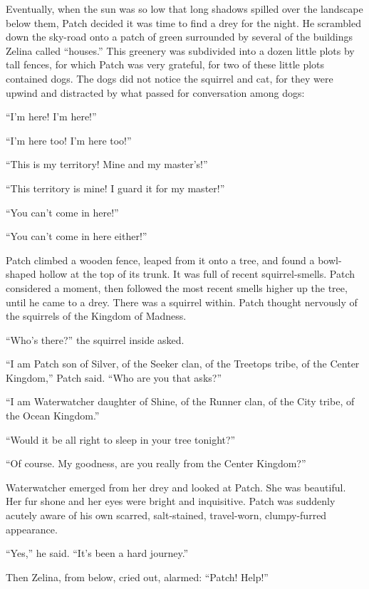 \documentclass[ebook,oneside,openany,17pt]{memoir}
\newenvironment{tolerant}[1]{%
  \par\tolerance=#1\relax
}{%
  \par
}
\begin{document}
\begin{tolerant}{1500}
Eventually, when the sun was so low that long shadows spilled over the
landscape below them, Patch decided it was time to find a drey for the
night. He scrambled down the sky-road onto a patch of green surrounded
by several of the buildings Zelina called “houses.” This greenery was
subdivided into a dozen little plots by tall fences, for which Patch
was very grateful, for two of these little plots contained dogs. The
dogs did not notice the squirrel and cat, for they were upwind and
distracted by what passed for conversation among dogs:
\end{tolerant}

“I’m here! I’m here!”

“I’m here too! I’m here too!”

“This is my territory! Mine and my master’s!”

“This territory is mine! I guard it for my master!”

“You can’t come in here!”

“You can’t come in here either!”

Patch climbed a wooden fence, leaped from it onto a tree, and found a
bowl-shaped hollow at the top of its trunk. It was full of recent
squirrel-smells. Patch considered a moment, then followed the most
recent smells higher up the tree, until he came to a drey. There was a
squirrel within. Patch thought nervously of the squirrels of the
Kingdom of Madness.

“Who’s there?” the squirrel inside asked.

“I am Patch son of Silver, of the Seeker clan, of the Treetops tribe,
of the Center Kingdom,” Patch said. “Who are you that asks?”

“I am Waterwatcher daughter of Shine, of the Runner clan, of the City
tribe, of the Ocean Kingdom.”

“Would it be all right to sleep in your tree tonight?”

“Of course. My goodness, are you really from the Center Kingdom?”

Waterwatcher emerged from her drey and looked at Patch. She was
beautiful. Her fur shone and her eyes were bright and
inquisitive. Patch was suddenly acutely aware of his own scarred,
salt-stained, travel-worn, clumpy-furred appearance.

“Yes,” he said. “It’s been a hard journey.”

\begin{tolerant}{2000}
Then Zelina, from below, cried out, alarmed: “Patch! Help!”
\end{tolerant}
\end{document}
